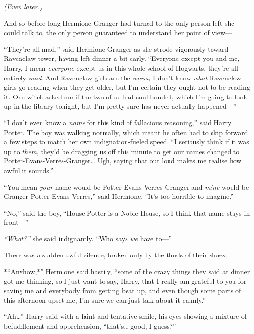 \emph{(Even later.)}

And so before long Hermione Granger had turned to the only person left
she could talk to, the only person guaranteed to understand her point of
view---

``They're all mad,'' said Hermione Granger as she strode vigorously
toward Ravenclaw tower, having left dinner a bit early. ``Everyone
except you and me, Harry, I mean \emph{everyone} except us in this whole
school of Hogwarts, they're all entirely \emph{mad.} And Ravenclaw girls
are the \emph{worst,} I don't know \emph{what} Ravenclaw girls go
reading when they get older, but I'm certain they ought not to be
reading it. One witch asked me if the two of us had soul-bonded, which
I'm going to look up in the library tonight, but I'm pretty sure has
never actually happened---''

``I don't even know a \emph{name} for this kind of fallacious
reasoning,'' said Harry Potter. The boy was walking normally, which
meant he often had to skip forward a few steps to match her own
indignation-fueled speed. ``I seriously think if it was up to
\emph{them}, they'd be dragging us off this minute to get our names
changed to Potter-Evans-Verres-Granger\ldots{} Ugh, saying that out loud
makes me realise how awful it sounds.''

``You mean \emph{your} name would be Potter-Evans-Verres-Granger and
\emph{mine} would be Granger-Potter-Evans-Verres,'' said Hermione.
``It's too horrible to imagine.''

``No,'' said the boy, ``House Potter is a Noble House, so I think that
name stays in front---''

\emph{``What?''} she said indignantly. ``Who says \emph{we} have to---''

There was a sudden awful silence, broken only by the thuds of their
shoes.

*``Anyhow,*'' Hermione said hastily, ``some of the crazy things they
said at dinner got me thinking, so I just want to say, Harry, that I
really am grateful to you for saving me and everybody from getting beat
up, and even though some parts of this afternoon upset me, I'm sure we
can just talk about it calmly.''

``Ah\ldots{}'' Harry said with a faint and tentative smile, his eyes
showing a mixture of befuddlement and apprehension, ``that's\ldots{}
good, I guess?''


